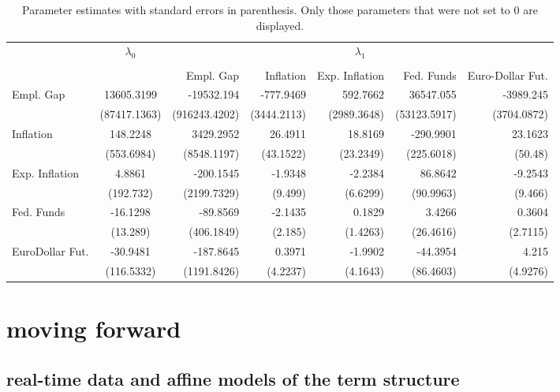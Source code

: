 \documentclass{article}
\numberwithin{equation}{section}
\begin{document}
\begin{table}
  \centering
  \begin{tabular}{lcrrrrr}
    \toprule
    & $\lambda_0$ &\multicolumn{5}{c}{$\lambda_1$} \\
    \cmidrule{2-2} \cmidrule(l){3-7} \\
    &  & Empl. Gap & Inflation & Exp. Inflation & Fed. Funds
    & Euro-Dollar Fut. \\
    Empl. Gap       & 13605.3199    &-19532.194 &-777.9469 &592.7662
                    &36547.055 &-3989.245 \\
                    & (87417.1363)  &(916243.4202) &(3444.2113) &(2989.3648)
                    &(53123.5917)   &(3704.0872) \\ %
    Inflation       &  148.2248     &3429.2952 &26.4911 &18.8169 &-290.9901
                    &23.1623 \\
                    & (553.6984)    &(8548.1197) &(43.1522) &(23.2349)
                    &(225.6018) &(50.48) \\
    Exp. Inflation  &  4.8861       &-200.1545 &-1.9348 &-2.2384 &86.8642
                    &-9.2543 \\
                    & (192.732)     &(2199.7329) &(9.499) &(6.6299) &(90.9963)
                    &(9.466) \\
    Fed. Funds      & -16.1298      &-89.8569 &-2.1435 &0.1829 &3.4266
                    &0.3604\\
                    & (13.289)      &(406.1849) &(2.185) &(1.4263) &(26.4616)
                    &(2.7115) \\
    EuroDollar Fut. &   -30.9481    &-187.8645 &0.3971 &-1.9902 &-44.3954
                    &4.215 \\
                    & (116.5332)    &(1191.8426) &(4.2237) &(4.1643) &(86.4603)
                    &(4.9276) \\
    \bottomrule
  \end{tabular}
  \caption{Parameter estimates with standard errors in parenthesis. Only those
  parameters that were not set to 0 are displayed.}
  \label{tab:3}
\end{table}

\section{moving forward}

\subsection{real-time data and affine models of the term structure}
\end{document}
